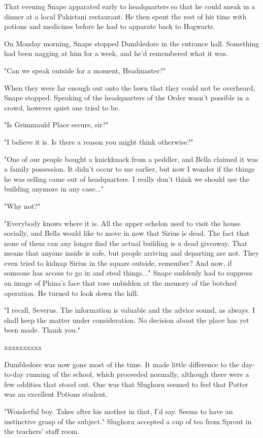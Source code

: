 \documentclass[a4paper,11pt]{article}
\begin{document}
That evening Snape apparated early to headquarters so that he could sneak in a dinner at a local Pakistani restaurant. He then spent the rest of his time with potions and medicines before he had to apparate back to Hogwarts.

On Monday morning, Snape stopped Dumbledore in the entrance hall. Something had been nagging at him for a week, and he'd remembered what it was.

"Can we speak outside for a moment, Headmaster?"

When they were far enough out onto the lawn that they could not be overheard, Snape stopped. Speaking of the headquarters of the Order wasn't possible in a crowd, however quiet one tried to be.

"Is Grimmauld Place secure, sir?"

"I believe it is. Is there a reason you might think otherwise?"

"One of our people bought a knickknack from a peddler, and Bella claimed it was a family possession. It didn't occur to me earlier, but now I wonder if the things he was selling came out of headquarters. I really don't think we should use the building anymore in any case..."

"Why not?"

"Everybody knows where it is. All the upper echelon used to visit the house socially, and Bella would like to move in now that Sirius is dead. The fact that none of them can any longer find the actual building is a dead giveaway. That means that anyone inside is safe, but people arriving and departing are not. They even tried to kidnap Sirius in the square outside, remember? And now, if someone has access to go in and steal things..." Snape suddenly had to suppress an image of Phina's face that rose unbidden at the memory of the botched operation. He turned to look down the hill.

"I recall, Severus. The information is valuable and the advice sound, as always. I shall keep the matter under consideration. No decision about the place has yet been made. Thank you."

xxxxxxxxxx

Dumbledore was now gone most of the time. It made little difference to the day-to-day running of the school, which proceeded normally, although there were a few oddities that stood out. One was that Slughorn seemed to feel that Potter was an excellent Potions student.

"Wonderful boy. Takes after his mother in that, I'd say. Seems to have an instinctive grasp of the subject." Slughorn accepted a cup of tea from Sprout in the teachers' staff room.
\end{document}
